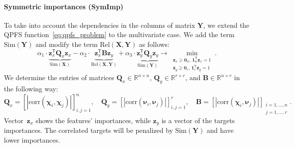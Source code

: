 \documentclass[preprint,12pt]{elsarticle}
\theoremstyle{definition}
\newcommand{\bz}{\mathbf{z}}
\newcommand{\bY}{\mathbf{Y}}
\newcommand{\bX}{\mathbf{X}}
\newcommand{\bB}{\mathbf{B}}
\newcommand{\bQ}{\mathbf{Q}}
\newcommand{\bbR}{\mathbb{R}}
\newcommand{\T}{\mathsf{T}}
\newcommand{\bchi}{\boldsymbol{\chi}}
\newcommand{\bnu}{\boldsymbol{\nu}}
\newcommand{\bOne}{\boldsymbol{1}}
\newcommand{\bZero}{\boldsymbol{0}}
\begin{document}
\paragraph{Symmetric importances (SymImp)}

To take into account the dependencies in the columns of matrix $\bY$, we extend the QPFS function~\eqref{eq:qpfs_problem} to the multivariate case.
We add the term~$\text{Sim}(\bY)$ and modify the term $\text{Rel}(\bX, \bY)$ as follows:
\begin{equation}
\alpha_1 \cdot \underbrace{\bz_x^{\T} \bQ_x \bz_x}_{\text{Sim}(\bX)} - \alpha_2 \cdot \underbrace{\bz_x^{\T} \bB \bz_y}_{\text{Rel}(\bX, \bY)} + \alpha_3 \cdot \underbrace{\bz_y^{\T} \bQ_y \bz_y}_{\text{Sim}(\bY)} \rightarrow \min_{\substack{\bz_x \geq \bZero_n, \, \bOne_n^{\T}\bz_x=1 \\ \bz_y \geq \bZero_r, \, \bOne_r^{\T}\bz_y=1}}.
\label{eq:symimp}
\end{equation}
We determine the entries of matrices $\bQ_x \in \bbR^{n \times n}$, $\bQ_y \in \bbR^{r \times r}$, and $\bB \in \bbR^{n \times r}$ in the following way:
\begin{equation*}
\bQ_x = \left[ |\text{corr}(\bchi_i, \bchi_j)| \right]_{i,j=1}^n, \quad
\bQ_y = \left[ |\text{corr}(\bnu_i, \bnu_j)| \right]_{i,j=1}^r, \quad
\bB =  \left[ |\text{corr}(\bchi_i, \bnu_j)| \right]_{\substack{i=1, \dots, n \\ j=1, \dots, r}}.
\end{equation*}
Vector~$\bz_x$ shows the features' importances, while $\bz_y$ is a vector of the targets importances.
The correlated targets will be penalized by $\text{Sim} (\bY)$ and have lower importances.
\end{document}

